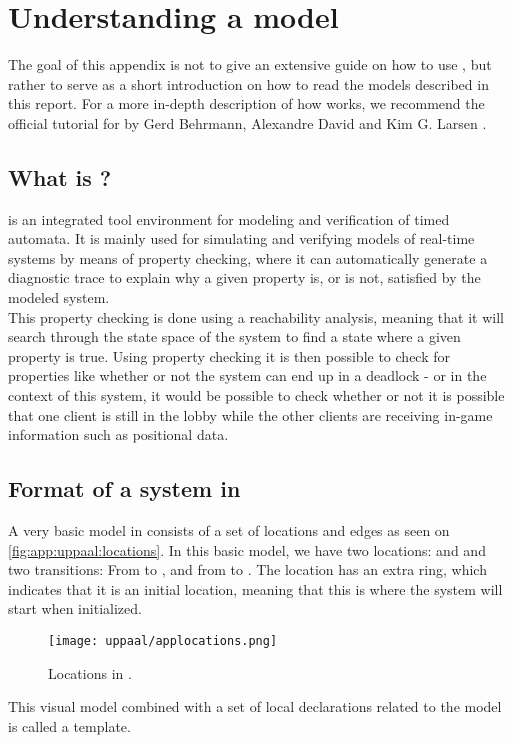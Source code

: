 \chapter{Understanding a \uppaal model}\label{app:uppaal}
The goal of this appendix is not to give an extensive guide on how to use \uppaal, but rather to serve as a short introduction on how to read the models described in this report.
For a more in-depth description of how \uppaal works, we recommend the official tutorial for  by Gerd Behrmann, Alexandre David and Kim G. Larsen \cite{uppaaltutorial}.

\section*{What is \uppaal?}
\uppaal is an integrated tool environment for modeling and verification of timed automata.
It is mainly used for simulating and verifying models of real-time systems \cite{uppaalintro} by means of property checking, where it can automatically generate a diagnostic trace to explain why a given property is, or is not, satisfied by the modeled system.\\
This property checking is done using a reachability analysis, meaning that it will search through the state space of the system to find a state where a given property is true.
Using property checking it is then possible to check for properties like whether or not the system can end up in a deadlock - or in the context of this system, it would be possible to check whether or not it is possible that one client is still in the lobby while the other clients are receiving in-game information such as positional data.

\section*{Format of a system in \uppaal}
A very basic model in \uppaal consists of a set of locations and edges as seen on \autoref{fig:app:uppaal:locations}.
In this basic model, we have two locations:  and  and two transitions: From  to , and from  to .
The location  has an extra ring, which indicates that it is an initial location, meaning that this is where the system will start when initialized.

\begin{figure}[H]
    \centering
    \texttt{[image: uppaal/applocations.png]}
    \caption{Locations in \uppaal.}
    \label{fig:app:uppaal:locations}
\end{figure}
\noindent
This visual model combined with a set of local declarations related to the model is called a template.

